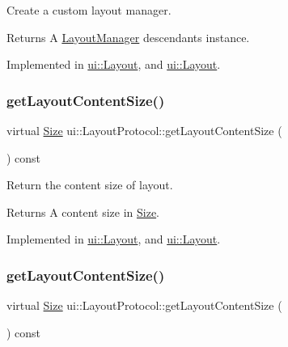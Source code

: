 Create a custom layout manager. 

\begin{DoxyReturn}{Returns}
A \hyperlink{classui_1_1LayoutManager}{Layout\+Manager} descendants instance. 
\end{DoxyReturn}


Implemented in \hyperlink{classui_1_1Layout_ade857c1e220dc8b5844966e2c37b7a1f}{ui\+::\+Layout}, and \hyperlink{classui_1_1Layout_a577a2868212962f2da8522f3fc5b81c7}{ui\+::\+Layout}.

\mbox{\label{classui_1_1LayoutProtocol_afacf70c8ceec076a9c1237427cbd614a}} 
\subsubsection{\texorpdfstring{get\+Layout\+Content\+Size()}{getLayoutContentSize()}\hspace{0.1cm}{\footnotesize\ttfamily [1/2]}}
{\footnotesize\ttfamily virtual \hyperlink{classSize}{Size} ui\+::\+Layout\+Protocol\+::get\+Layout\+Content\+Size (\begin{DoxyParamCaption}{ }\end{DoxyParamCaption}) const\hspace{0.3cm}{\ttfamily [pure virtual]}}



Return the content size of layout. 

\begin{DoxyReturn}{Returns}
A content size in \hyperlink{classSize}{Size}. 
\end{DoxyReturn}


Implemented in \hyperlink{classui_1_1Layout_a75eb33c244061dd6ab91a37536fd5b8f}{ui\+::\+Layout}, and \hyperlink{classui_1_1Layout_a982a59e5b4697183b4899721842cd3a5}{ui\+::\+Layout}.

\mbox{\label{classui_1_1LayoutProtocol_afacf70c8ceec076a9c1237427cbd614a}} 
\subsubsection{\texorpdfstring{get\+Layout\+Content\+Size()}{getLayoutContentSize()}\hspace{0.1cm}{\footnotesize\ttfamily [2/2]}}
{\footnotesize\ttfamily virtual \hyperlink{classSize}{Size} ui\+::\+Layout\+Protocol\+::get\+Layout\+Content\+Size (\begin{DoxyParamCaption}{ }\end{DoxyParamCaption}) const\hspace{0.3cm}{\ttfamily [pure virtual]}}



